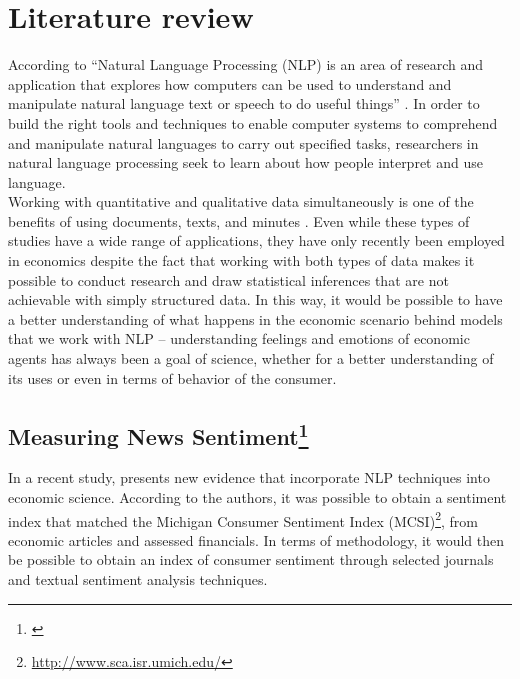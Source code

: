 \chapter{\textbf{Literature review}}  \label{chapter:lit}

According to \cite{chowdhury2003} ``Natural Language Processing (NLP) is an area of research and application that explores how computers can be used to understand and manipulate natural language text or speech to do useful things'' \cite[p.51]{chowdhury2003}. In order to build the right tools and techniques to enable computer systems to comprehend and manipulate natural languages to carry out specified tasks, researchers in natural language processing seek to learn about how people interpret and use language.\\

Working with quantitative and qualitative data simultaneously is one of the benefits of using documents, texts, and minutes \cite[p. 1]{bholat2015text}. Even while these types of studies have a wide range of applications, they have only recently been employed in economics despite the fact that working with both types of data makes it possible to conduct research and draw statistical inferences that are not achievable with simply structured data. In this way, it would be possible to have a better understanding of what happens in the economic scenario behind models that we work with NLP -- understanding feelings and emotions of economic agents has always been a goal of science, whether for a better understanding of its uses or even in terms of behavior of the consumer.\\

\section{Measuring News Sentiment\protect\footnote{\cite{shapiro2020measuring}}}

In a recent study, \cite{shapiro2020measuring} presents new evidence that incorporate NLP techniques into economic science. According to the authors, it was possible to obtain a sentiment index that matched the Michigan Consumer Sentiment Index (MCSI)\footnote{\url{http://www.sca.isr.umich.edu/}}, from economic articles and assessed financials. In terms of methodology, it would then be possible to obtain an index of consumer sentiment through selected journals and textual sentiment analysis techniques.\\

